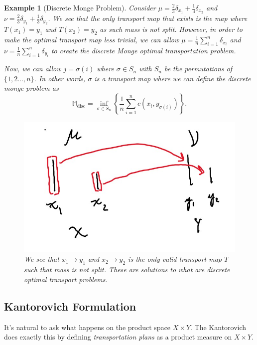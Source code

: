 \documentclass[12pt]{article}
\theoremstyle{plain}
\newtheorem{exmp}{Example}[section]
\numberwithin{equation}{section}
\begin{document}
\begin{exmp}[Discrete Monge Problem]\label{exmp:monge}
Consider $\mu = \frac{2}{3}\delta_{x_1} + \frac{1}{3}\delta_{x_2}$ and $\nu = \frac{2}{3}\delta_{y_1} + \frac{1}{3}\delta_{y_2}$. We see that the only transport map that exists is the map where $T(x_1) = y_1$ and $T(x_2)=y_2$ as such mass is not split.
However, in order to make the optimal transport map less trivial, we can allow $\mu = \frac{1}{n}\sum_{i=1}^n\delta_{x_i}$ and $\nu = \frac{1}{n}\sum_{i=1}^n\delta_{y_i}$ to create the discrete Monge optimal transportation problem.

Now, we can allow $j = \sigma(i)$ where $\sigma \in S_n$ with $S_n$ be the permutations of $\{1,2\dots,n\}$. In other words, $\sigma$ is a transport map where we can define the discrete monge problem as 
\[\mathbb{M}_{\text{disc}} = \inf_{\sigma\in S_n}\left\{\frac{1}{n}\sum_{i=1}^nc(x_i,y_{\sigma(i)})\right\}.\]
\begin{figure}[H]
  \center
  \includegraphics[scale=0.3]{monge.jpg}
  \caption{We see that $x_1\to y_1$ and $x_2\to y_2$ is the only valid transport map $T$ such that mass is not split. These are solutions to what are discrete optimal transport problems.}
  \label{fig:monge}
\end{figure}
\end{exmp}
\subsection{Kantorovich Formulation}
It's natural to ask what happens on the product space $X\times Y$. The Kantorovich does exactly this by defining \textit{transportation plans} as a product measure on $X\times Y$.
\end{document}
